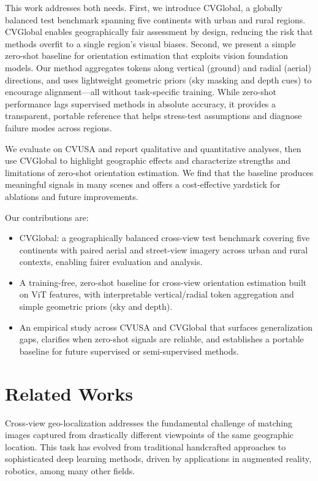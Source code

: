 \documentclass{bmvc2k}
\begin{document}
This work addresses both needs. First, we introduce CVGlobal, a globally balanced test benchmark spanning five continents with urban and rural regions. CVGlobal enables geographically fair assessment by design, reducing the risk that methods overfit to a single region's visual biases. Second, we present a simple zero-shot baseline for orientation estimation that exploits vision foundation models. Our method aggregates tokens along vertical (ground) and radial (aerial) directions, and uses lightweight geometric priors (sky masking and depth cues) to encourage alignment—all without task-specific training. While zero-shot performance lags supervised methods in absolute accuracy, it provides a transparent, portable reference that helps stress-test assumptions and diagnose failure modes across regions.

We evaluate on CVUSA and report qualitative and quantitative analyses, then use CVGlobal to highlight geographic effects and characterize strengths and limitations of zero-shot orientation estimation. We find that the baseline produces meaningful signals in many scenes and offers a cost-effective yardstick for ablations and future improvements.

Our contributions are:

\begin{itemize}
    \item CVGlobal: a geographically balanced cross-view test benchmark covering five continents with paired aerial and street-view imagery across urban and rural contexts, enabling fairer evaluation and analysis.
    \item A training-free, zero-shot baseline for cross-view orientation estimation built on ViT features, with interpretable vertical/radial token aggregation and simple geometric priors (sky and depth).
    \item An empirical study across CVUSA and CVGlobal that surfaces generalization gaps, clarifies when zero-shot signals are reliable, and establishes a portable baseline for future supervised or semi-supervised methods.
\end{itemize}

\section{Related Works}
\label{sec:related_works}

Cross-view geo-localization addresses the fundamental challenge of matching images captured from drastically different viewpoints of the same geographic location. This task has evolved from traditional handcrafted approaches to sophisticated deep learning methods, driven by applications in augmented reality, robotics, among many other fields.
\end{document}
